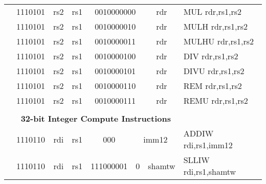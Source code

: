 \begin{table}[p]
\begin{small}
\begin{center}
\begin{tabular}{rcccccccccl}
&
\multicolumn{2}{|c|}{1110101} &
\multicolumn{1}{c|}{rs2} &
\multicolumn{1}{c|}{rs1} &
\multicolumn{4}{c|}{0010000000} &
\multicolumn{1}{c|}{rdr} & MUL rdr,rs1,rs2 \\
\cline{2-10}
  

&
\multicolumn{2}{|c|}{1110101} &
\multicolumn{1}{c|}{rs2} &
\multicolumn{1}{c|}{rs1} &
\multicolumn{4}{c|}{0010000010} &
\multicolumn{1}{c|}{rdr} & MULH rdr,rs1,rs2 \\
\cline{2-10}
  

&
\multicolumn{2}{|c|}{1110101} &
\multicolumn{1}{c|}{rs2} &
\multicolumn{1}{c|}{rs1} &
\multicolumn{4}{c|}{0010000011} &
\multicolumn{1}{c|}{rdr} & MULHU rdr,rs1,rs2 \\
\cline{2-10}
  

&
\multicolumn{2}{|c|}{1110101} &
\multicolumn{1}{c|}{rs2} &
\multicolumn{1}{c|}{rs1} &
\multicolumn{4}{c|}{0010000100} &
\multicolumn{1}{c|}{rdr} & DIV rdr,rs1,rs2 \\
\cline{2-10}
  

&
\multicolumn{2}{|c|}{1110101} &
\multicolumn{1}{c|}{rs2} &
\multicolumn{1}{c|}{rs1} &
\multicolumn{4}{c|}{0010000101} &
\multicolumn{1}{c|}{rdr} & DIVU rdr,rs1,rs2 \\
\cline{2-10}
  

&
\multicolumn{2}{|c|}{1110101} &
\multicolumn{1}{c|}{rs2} &
\multicolumn{1}{c|}{rs1} &
\multicolumn{4}{c|}{0010000110} &
\multicolumn{1}{c|}{rdr} & REM rdr,rs1,rs2 \\
\cline{2-10}
  

&
\multicolumn{2}{|c|}{1110101} &
\multicolumn{1}{c|}{rs2} &
\multicolumn{1}{c|}{rs1} &
\multicolumn{4}{c|}{0010000111} &
\multicolumn{1}{c|}{rdr} & REMU rdr,rs1,rs2 \\
\cline{2-10}
  

&
\multicolumn{9}{c}{} & \\
&
\multicolumn{9}{c}{\bf 32-bit Integer Compute Instructions} & \\
\cline{2-10}
  

&
\multicolumn{2}{|c|}{1110110} &
\multicolumn{1}{c|}{rdi} &
\multicolumn{1}{c|}{rs1} &
\multicolumn{1}{c|}{000} &
\multicolumn{4}{c|}{imm12} & ADDIW rdi,rs1,imm12 \\
\cline{2-10}
  

&
\multicolumn{2}{|c|}{1110110} &
\multicolumn{1}{c|}{rdi} &
\multicolumn{1}{c|}{rs1} &
\multicolumn{3}{c|}{111000001} &
\multicolumn{1}{c|}{0} &
\multicolumn{1}{c|}{shamtw} & SLLIW rdi,rs1,shamtw \\
\cline{2-10}
  


\end{tabular}
\end{center}
\end{small}
\end{table}
